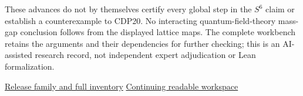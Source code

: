\documentclass[11pt,a4paper]{article}
\begin{document}
These advances do not by themselves certify every global step in the
$S^6$ claim or establish a counterexample to CDP20. No interacting
quantum-field-theory mass-gap conclusion follows from the displayed lattice
maps. The complete workbench retains the arguments and their dependencies
for further checking; this is an AI-assisted research record, not independent
expert adjudication or Lean formalization.

\href{https://doi.org/10.5281/zenodo.22235523}{Release family and full inventory}
\quad\textbar\quad
\href{https://www.overleaf.com/read/rtmyqxyrzprn#fa24eb}{Continuing readable workspace}
\end{document}
